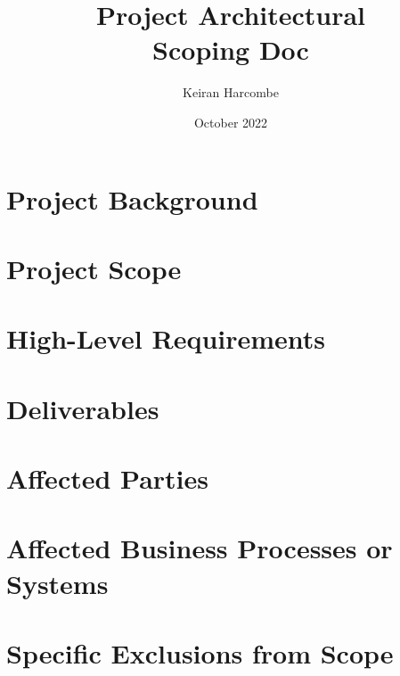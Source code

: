 \documentclass[a4paper]{article}
\title{Project Architectural \\ Scoping Doc}
\author{Keiran Harcombe}
\date{October 2022}
\begin{document}
	\maketitle
	
\section{Project Background} %

\section{Project Scope} %

\section{High-Level Requirements} %

\section{Deliverables} %

\section{Affected Parties} %

\section{Affected Business Processes or Systems} %

\section{Specific Exclusions from Scope} %
\end{document}
